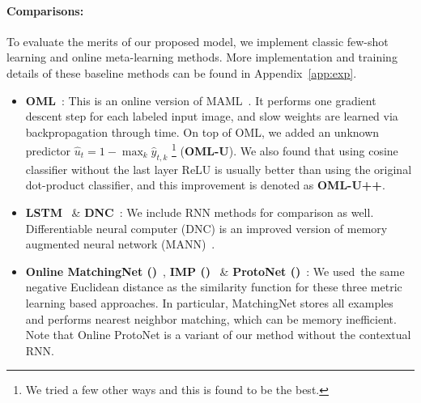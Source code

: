 \vspace{-0.1in}
\paragraph{Comparisons:}
To evaluate the merits of our proposed model, we implement classic few-shot learning and online
meta-learning methods. More implementation and training details of these baseline methods can be
found in Appendix~\ref{app:exp}.


\vspace{-0.1in}
\iflatexml
\begin{itemize}
    \item \textbf{OML}~\citep{oml}: This is an online version of MAML~\citep{maml}. It performs one
    gradient descent step for each labeled input image, and slow weights are learned via
    backpropagation through time. On top of OML, we added an unknown predictor $\hat{u}_t = 1 -
    \max_k \hat{y}_{t,k}$ \footnote{We tried a few other ways and this is found to be the
    best.} (\textbf{OML-U}). We also found that using cosine classifier without the last layer ReLU
    is usually better than using the original dot-product classifier, and this improvement is denoted
    as \textbf{OML-U++}.
    \item \textbf{LSTM}~\citep{lstm} \& \textbf{DNC}~\citep{dnc}: We include RNN methods for
    comparison as well. Differentiable neural computer (DNC) is an improved version of memory
    augmented neural network (MANN)~\citep{mann}.
    \item \textbf{Online MatchingNet (\OnlineMatchingNet{})}~\citep{matchingnet}, 
    \textbf{IMP (\OnlineIMP{})}~\citep{imp} \&
    \textbf{ProtoNet (\OnlineProtoNet{})}~\citep{protonet}: We used\ the same negative Euclidean distance as the
    similarity function for these three metric learning based approaches.  In particular,
    MatchingNet stores all examples and performs nearest neighbor matching, which can be memory
    inefficient. Note that Online ProtoNet is a variant of our method without the contextual RNN.
\end{itemize}
\else
